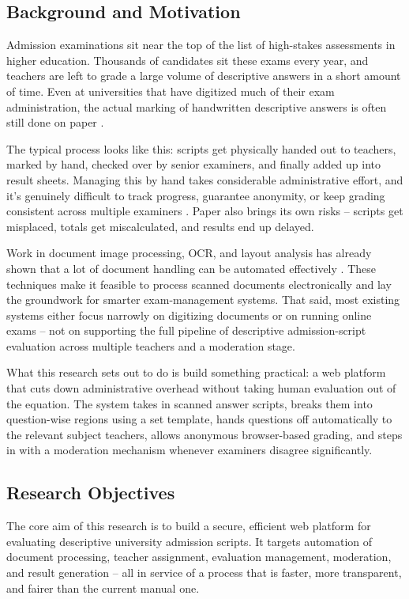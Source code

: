 \subsection{Background and Motivation}

Admission examinations sit near the top of the list of high-stakes assessments in higher education. Thousands of candidates sit these exams every year, and teachers are left to grade a large volume of descriptive answers in a short amount of time. Even at universities that have digitized much of their exam administration, the actual marking of handwritten descriptive answers is often still done on paper \cite{article}.

The typical process looks like this: scripts get physically handed out to teachers, marked by hand, checked over by senior examiners, and finally added up into result sheets. Managing this by hand takes considerable administrative effort, and it's genuinely difficult to track progress, guarantee anonymity, or keep grading consistent across multiple examiners \cite{8878791}. Paper also brings its own risks -- scripts get misplaced, totals get miscalculated, and results end up delayed.

Work in document image processing, OCR, and layout analysis has already shown that a lot of document handling can be automated effectively \cite{4376991,inbook,docbank2020}. These techniques make it feasible to process scanned documents electronically and lay the groundwork for smarter exam-management systems. That said, most existing systems either focus narrowly on digitizing documents or on running online exams -- not on supporting the full pipeline of descriptive admission-script evaluation across multiple teachers and a moderation stage.

What this research sets out to do is build something practical: a web platform that cuts down administrative overhead without taking human evaluation out of the equation. The system takes in scanned answer scripts, breaks them into question-wise regions using a set template, hands questions off automatically to the relevant subject teachers, allows anonymous browser-based grading, and steps in with a moderation mechanism whenever examiners disagree significantly.

\subsection{Research Objectives}

The core aim of this research is to build a secure, efficient web platform for evaluating descriptive university admission scripts. It targets automation of document processing, teacher assignment, evaluation management, moderation, and result generation -- all in service of a process that is faster, more transparent, and fairer than the current manual one.

